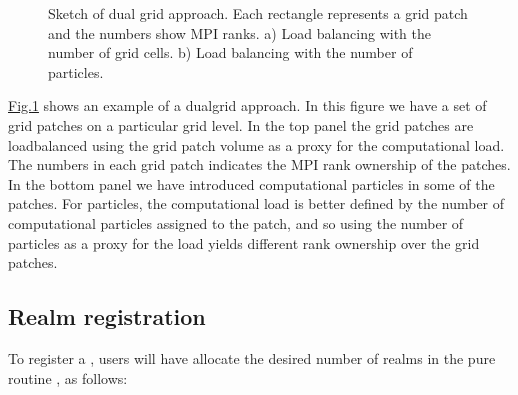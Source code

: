 \documentclass[letterpaper,10pt,english]{sphinxmanual}
\let\sphinxpxdimen\pdfpxdimen\else\newdimen\sphinxpxdimen
\begin{document}
\begin{figure}[htb]
\centering
\capstart

\noindent\sphinxincludegraphics[width=360\sphinxpxdimen]{{DualMesh}.png}
\caption{Sketch of dual grid approach.
Each rectangle represents a grid patch and the numbers show MPI ranks. a) Load balancing with the number of grid cells. b) Load balancing with the number of particles.}\label{\detokenize{Source/Realm:id1}}\label{\detokenize{Source/Realm:fig-dualmesh}}\end{figure}

\sphinxAtStartPar
\hyperref[\detokenize{Source/Realm:fig-dualmesh}]{Fig.\@ \ref{\detokenize{Source/Realm:fig-dualmesh}}} shows an example of a dual\sphinxhyphen{}grid approach.
In  this figure we have a set of grid patches on a particular grid level.
In the top panel the grid patches are load\sphinxhyphen{}balanced using the grid patch volume as a proxy for the computational load.
The numbers in each grid patch indicates the MPI rank ownership of the patches.
In the bottom panel we have introduced computational particles in some of the patches.
For particles, the computational load is better defined by the number of computational particles assigned to the patch, and so using the number of particles as a proxy for the load yields different rank ownership over the grid patches.


\subsection{Realm registration}
\label{\detokenize{Source/Realm:realm-registration}}
\sphinxAtStartPar
To register a , users will have  allocate the desired number of realms in the pure routine , as follows:

\begin{sphinxVerbatim}[commandchars=\\\{\},formatcom=\scriptsize]
 
\end{sphinxVerbatim}
\end{document}
